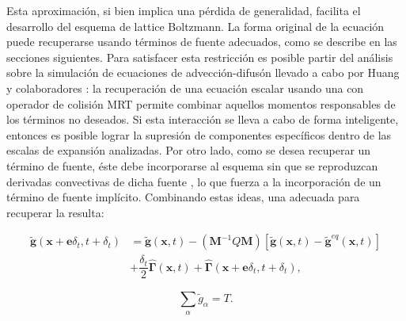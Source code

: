 Esta aproximaci\'on, si bien implica una p\'erdida de generalidad, facilita el desarrollo del esquema de lattice Boltzmann. La forma original de la ecuaci\'on puede recuperarse usando t\'erminos de fuente adecuados, como se describe en las secciones siguientes. Para satisfacer esta restricci\'on es posible partir del an\'alisis sobre la simulaci\'on de ecuaciones de advecci\'on-difus\'on llevado a cabo por Huang y colaboradores \cite{huang_modified_2014, huang_numerical_2011, huang_lattice_2015}: la recuperaci\'on de una ecuaci\'on escalar usando una \lbe{} con operador de colisi\'on MRT permite combinar aquellos momentos responsables de los t\'erminos no deseados. Si esta interacci\'on se lleva a cabo de forma inteligente, entonces es posible lograr la supresi\'on de componentes espec\'ificos dentro de las escalas de expansi\'on analizadas. Por otro lado, como se desea recuperar un t\'ermino de fuente, \'este debe incorporarse al esquema sin que se reproduzcan derivadas convectivas de dicha fuente \cite{cheng_introducing_2008}, lo que fuerza a la incorporaci\'on de un t\'ermino de fuente impl\'icito. Combinando estas ideas, una \lbe{} adecuada para recuperar la  resulta:

\begin{equation}
	\begin{aligned}
		\tilde{\bm{g}}(\bm{x} + \bm{e} \delta_t, t+\delta_t) &=
		\tilde{\bm{g}}(\bm{x}, t) - (\bm{M}^{-1}Q\bm{M}) \left[ \tilde{\bm{g}}(\bm{x}, t) - \tilde{\bm{g}}^{eq}(\bm{x}, t) \right] \\
		&  + \dfrac{\delta_t}{2} \hat{\bm{\Gamma}}(\bm{x},t) + \hat{\bm{\Gamma}}(\bm{x} +\bm{e}\delta_t,t + \delta_t),
	\end{aligned}
	\label{eq:g_tilde_2d}	
\end{equation}

\begin{equation}
	\sum_{\alpha} \tilde{g}_{\alpha} = T.
\end{equation}


